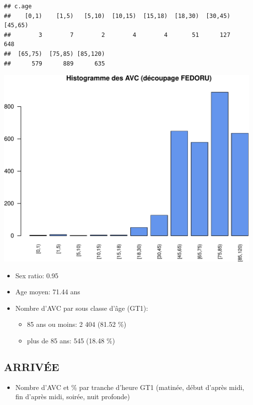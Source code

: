 \documentclass[]{article}
\begin{document}
\begin{verbatim}
## c.age
##    [0,1)    [1,5)   [5,10)  [10,15)  [15,18)  [18,30)  [30,45)  [45,65) 
##        3        7        2        4        4       51      127      648 
##  [65,75)  [75,85) [85,120) 
##      579      889      635
\end{verbatim}

\includegraphics{rapport2014_V4_files/figure-latex/Patients-2.pdf}

\begin{itemize}
\itemsep1pt\parskip0pt
\item
  Sex ratio: 0.95
\item
  Age moyen: 71.44 ans
\item
  Nombre d'AVC par sous classe d'âge (GT1):

  \begin{itemize}
  \itemsep1pt\parskip0pt
  \item
    85 ans ou moins: 2 404 (81.52 \%)
  \item
    plus de 85 ans: 545 (18.48 \%)
  \end{itemize}
\end{itemize}

\subsection{ARRIVÉE}\label{arrivee-2}

\begin{itemize}
\itemsep1pt\parskip0pt
\item
  Nombre d'AVC et \% par tranche d'heure GT1 (matinée, début d'après
  midi, fin d'après midi, soirée, nuit profonde)
\end{itemize}
\end{document}
